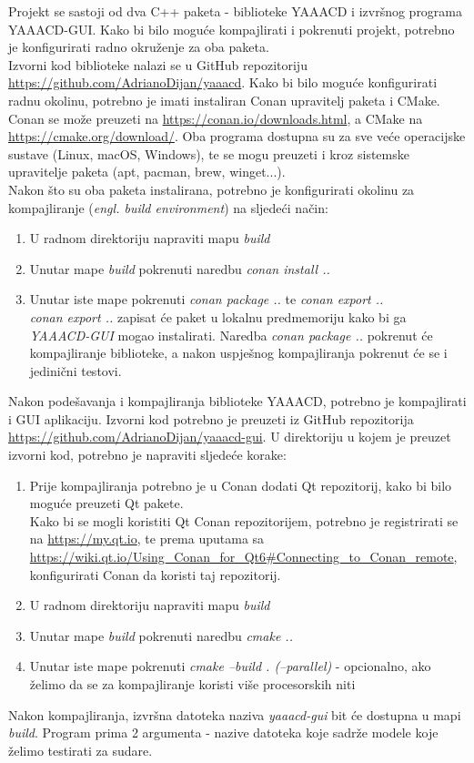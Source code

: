 Projekt se sastoji od dva C++ paketa - biblioteke YAAACD i izvršnog programa YAAACD-GUI. Kako bi bilo moguće
kompajlirati i pokrenuti projekt, potrebno je konfigurirati radno okruženje za oba paketa.\\

Izvorni kod biblioteke nalazi se u GitHub repozitoriju \url{https://github.com/AdrianoDijan/yaaacd}.
Kako bi bilo moguće konfigurirati radnu okolinu, potrebno je imati instaliran Conan upravitelj paketa i CMake.
Conan se može preuzeti na \url{https://conan.io/downloads.html}, a CMake na \url{https://cmake.org/download/}.
Oba programa dostupna su za sve veće operacijske sustave (Linux, macOS, Windows), te se mogu preuzeti
i kroz sistemske upravitelje paketa (apt, pacman, brew, winget...).\\

Nakon što su oba paketa instalirana, potrebno je konfigurirati okolinu
za kompajliranje (\textit{engl. build environment}) na sljedeći način:

\begin{enumerate}
  \item U radnom direktoriju napraviti mapu \textit{build}
  \item Unutar mape \textit{build} pokrenuti naredbu \textit{conan install ..}
  \item Unutar iste mape pokrenuti \textit{conan package ..} te \textit{conan export ..}\\
      \textit{conan export ..} zapisat će paket u lokalnu predmemoriju kako bi ga \textit{YAAACD-GUI} mogao instalirati.
      Naredba \textit{conan package ..} pokrenut će kompajliranje biblioteke, a nakon uspješnog kompajliranja pokrenut će
      se i jedinični testovi.
\end{enumerate}

Nakon podešavanja i kompajliranja biblioteke YAAACD, potrebno je kompajlirati i GUI aplikaciju.
Izvorni kod potrebno je preuzeti iz GitHub repozitorija \url{https://github.com/AdrianoDijan/yaaacd-gui}.
U direktoriju u kojem je preuzet izvorni kod, potrebno je napraviti sljedeće korake:

\begin{enumerate}
  \item Prije kompajliranja potrebno je u Conan dodati Qt repozitorij, kako bi bilo moguće preuzeti Qt pakete.\\
      Kako bi se mogli koristiti Qt Conan repozitorijem, potrebno je registrirati se na \url{https://my.qt.io},
      te prema uputama sa \url{https://wiki.qt.io/Using_Conan_for_Qt6#Connecting_to_Conan_remote}, konfigurirati
      Conan da koristi taj repozitorij.
  \item U radnom direktoriju napraviti mapu \textit{build}
  \item Unutar mape \textit{build} pokrenuti naredbu \textit{cmake ..}
  \item Unutar iste mape pokrenuti \textit{cmake --build . (--parallel)} - opcionalno, ako 
    želimo da se za kompajliranje koristi više procesorskih niti
\end{enumerate}

Nakon kompajliranja, izvršna datoteka naziva \textit{yaaacd-gui} bit će dostupna u mapi \textit{build}.
Program prima 2 argumenta - nazive datoteka koje sadrže modele koje želimo testirati za sudare.
